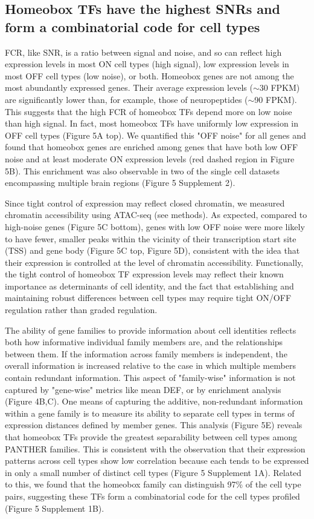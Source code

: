 \subsection{Homeobox TFs have the highest SNRs and form a combinatorial code for cell types}
FCR, like SNR, is a ratio between signal and noise, and so can reflect high expression levels in most ON cell types (high signal), low expression levels in most OFF cell types (low noise), or both. Homeobox genes are not among the most abundantly expressed genes. Their average expression levels ($\sim$30 FPKM) are significantly lower than, for example, those of neuropeptides ($\sim$90 FPKM). This suggests that the high FCR of homeobox TFs depend more on low noise than high signal. In fact, most homeobox TFs have uniformly low expression in OFF cell types (Figure 5A top). We quantified this "OFF noise" for all genes and found that homeobox genes are enriched among genes that have both low OFF noise and at least moderate ON expression levels (red dashed region in Figure 5B). This enrichment was also observable in two of the single cell datasets encompassing multiple brain regions (Figure 5 Supplement 2). 

Since tight control of expression may reflect closed chromatin, we measured chromatin accessibility using ATAC-seq (see methods). As expected, compared to high-noise genes (Figure 5C bottom), genes with low OFF noise were more likely to have fewer, smaller peaks within the vicinity of their transcription start site (TSS) and gene body (Figure 5C top, Figure 5D), consistent with the idea that their expression is controlled at the level of chromatin accessibility. Functionally, the tight control of homeobox TF expression levels may reflect their known importance as determinants of cell identity, and the fact that establishing and maintaining robust differences between cell types may require tight ON/OFF regulation rather than graded regulation.

The ability of gene families to provide information about cell identities reflects both how informative individual family members are, and the relationships between them. If the information across family members is independent, the overall information is increased relative to the case in which multiple members contain redundant information. This aspect of "family-wise" information is not captured by "gene-wise" metrics like mean DEF, or by enrichment analysis (Figure 4B,C). One means of capturing the additive, non-redundant information within a gene family is to measure its ability to separate cell types in terms of expression distances defined by member genes. This analysis (Figure 5E) reveals that homeobox TFs provide the greatest separability between cell types among PANTHER families. This is consistent with the observation that their expression patterns across cell types show low correlation because each tends to be expressed in only a small number of distinct cell types (Figure 5 Supplement 1A). Related to this, we found that the homeobox family can distinguish 97\% of the cell type pairs, suggesting these TFs form a combinatorial code for the cell types profiled (Figure 5 Supplement 1B). 

